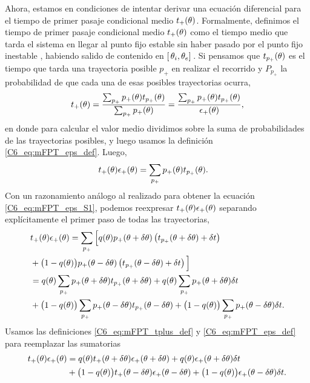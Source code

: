 \documentclass[./main.tex]{subfiles}
\begin{document}
Ahora, estamos en condiciones de intentar derivar una ecuación diferencial para el tiempo de primer pasaje condicional medio $t_{+}(\theta)$. Formalmente, definimos el tiempo de primer pasaje condicional medio $t_{+}(\theta)$ como el tiempo medio que tarda el sistema en llegar al punto fijo estable \xxe sin haber pasado por el punto fijo inestable \xxi, habiendo salido de \xx contenido en $[ \,\theta_i,\theta_e ]\,$. Si pensamos que $t_{p_{+}}(\theta)$ es el tiempo que tarda una trayectoria posible $p_{+}$ en realizar el recorrido y $P_{p_{+}}$ la probabilidad de que cada una de esas posibles trayectorias ocurra,
\begin{align}
    t_{+}(\theta) = \frac{\sum_{p_{+}}p_{+}(\theta) t_{p_{+}}(\theta)}{\sum_{p_{+}}p_{+}(\theta)} = \frac{\sum_{p_{+}}p_{+}(\theta) t_{p_{+}}(\theta)}{\epsilon_{+}(\theta)},
\end{align}
en donde para calcular el valor medio dividimos sobre la suma de probabilidades de las trayectorias posibles, y luego usamos la definición \ref{C6_eq:mFPT_eps_def}. Luego,
\begin{align}
    t_{+}(\theta) \epsilon_{+}(\theta)  &= \sum_{p_{+}}p_{+}(\theta) t_{p_{+}}(\theta).
    \label{C6_eq:mFPT_tplus_def}
\end{align}
Con un razonamiento análogo al realizado para obtener la ecuación \ref{C6_eq:mFPT_eps_S1}, podemos reexpresar $t_{+}(\theta) \epsilon_{+}(\theta)$ separando explícitamente el primer paso de todas las trayectorias,  
\begin{align}
   & t_{+}(\theta) \epsilon_{+}(\theta) = \sum_{p_{+}} \Big[ q(\theta)  p_{+}(\theta + \delta\theta ) \left( t_{p_{+}}(\theta + \delta\theta) + \delta t \right)  \nonumber \\ & + \big( 1 - q(\theta) \big)  p_{+}(\theta - \delta\theta ) \left( t_{p_{+}}(\theta - \delta\theta) + \delta t \right)\Big] \nonumber \\
   & =  q(\theta) \sum_{p_{+}} p_{+}(\theta + \delta\theta ) t_{p_{+}}(\theta + \delta\theta) + q(\theta) \sum_{p_{+}} p_{+}(\theta + \delta\theta ) \delta t  \nonumber \\ & + \big( 1 - q(\theta) \big) \sum_{p_{+}}p_{+}(\theta - \delta\theta ) t_{p_{+}}(\theta - \delta\theta) +  \big( 1 - q(\theta) \big) \sum_{p_{+}}p_{+}(\theta - \delta\theta ) \delta t .
\end{align}
Usamos las definiciones \ref{C6_eq:mFPT_tplus_def} y \ref{C6_eq:mFPT_eps_def} para reemplazar las sumatorias
\begin{align}
   t_{+}(\theta) \epsilon_{+}(\theta) & = q(\theta) t_{+}(\theta + \delta\theta) \epsilon_{+}(\theta + \delta\theta) + q(\theta) \epsilon_{+}(\theta + \delta\theta) \delta t \nonumber \\ & + \big( 1 - q(\theta) \big) t_{+}(\theta - \delta\theta) \epsilon_{+}(\theta - \delta\theta) +  \big( 1 - q(\theta) \big) \epsilon_{+}(\theta - \delta\theta) \delta t.
   \label{C6_eq:mFPT_tplus_S1}
\end{align}
\end{document}
